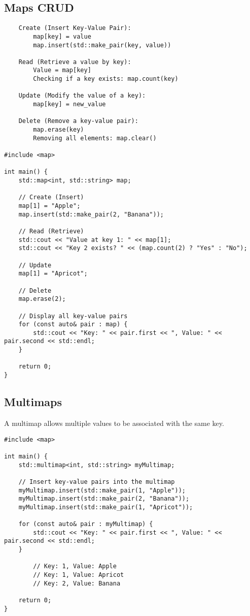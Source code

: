 \documentclass[openany]{report}
\begin{document}
\subsection{Maps CRUD}

\begin{verbatim}
    Create (Insert Key-Value Pair):
        map[key] = value 
        map.insert(std::make_pair(key, value))

    Read (Retrieve a value by key):
        Value = map[key]
        Checking if a key exists: map.count(key)

    Update (Modify the value of a key):
        map[key] = new_value

    Delete (Remove a key-value pair):
        map.erase(key)
        Removing all elements: map.clear()

#include <map>

int main() {
    std::map<int, std::string> map;

    // Create (Insert)
    map[1] = "Apple";
    map.insert(std::make_pair(2, "Banana"));

    // Read (Retrieve)
    std::cout << "Value at key 1: " << map[1];
    std::cout << "Key 2 exists? " << (map.count(2) ? "Yes" : "No");

    // Update
    map[1] = "Apricot";

    // Delete
    map.erase(2);

    // Display all key-value pairs
    for (const auto& pair : map) {
        std::cout << "Key: " << pair.first << ", Value: " << pair.second << std::endl;
    }

    return 0;
}
\end{verbatim}

\subsection{Multimaps}

A multimap allows multiple values to be associated with the same key. 

\begin{verbatim}
#include <map>

int main() {
    std::multimap<int, std::string> myMultimap;

    // Insert key-value pairs into the multimap
    myMultimap.insert(std::make_pair(1, "Apple"));
    myMultimap.insert(std::make_pair(2, "Banana"));
    myMultimap.insert(std::make_pair(1, "Apricot"));

    for (const auto& pair : myMultimap) {
        std::cout << "Key: " << pair.first << ", Value: " << pair.second << std::endl;
    }

        // Key: 1, Value: Apple
        // Key: 1, Value: Apricot
        // Key: 2, Value: Banana

    return 0;
}
\end{verbatim}
\end{document}
